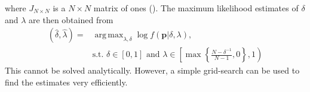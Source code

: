 \documentclass[11pt]{article}
\DeclareMathOperator*{\argmax}{arg\,max}
\theoremstyle{definition}
\theoremstyle{definition}
\begin{document}
where $J_{N \times N}$ is a $N\times N$ matrix of ones (\cite{dobbin2005sample, rao2009linear}). The maximum likelihood estimates of $\delta$ and $\lambda$ are then obtained from
\begin{align*}
\left(\hat{\delta}, \hat{\lambda}\right) =& \argmax_{\lambda, \delta} \log  f\left(\boldsymbol{p}| \delta, \lambda \right),\\
& \text{s.t. } \nonumber \delta \in [0,1] \text{ and } \lambda \in \left[  \max \left\{ \frac{N-\delta^{-1}}{N-1}, 0\right\}, 1 \right)
\end{align*}
This  cannot be solved analytically. However, a simple grid-search can be used to find the estimates very efficiently. 







\end{document}
